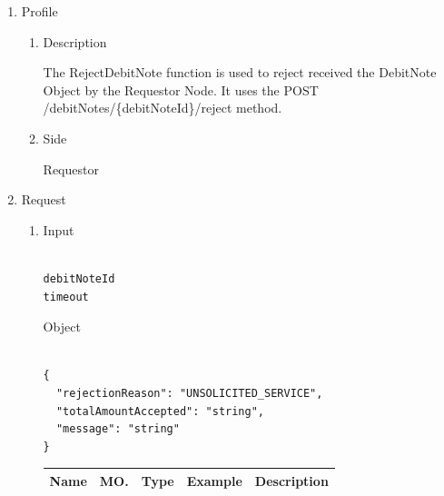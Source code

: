 \newpage



\begin{enumerate}

\item Profile

\begin{enumerate}

\item Description

The RejectDebitNote function is used to reject received the DebitNote Object by the Requestor Node. 
It uses the POST /debitNotes/\{debitNoteId\}/reject method.

\item Side

Requestor

\end{enumerate}

\item Request

\begin{enumerate}

\item Input

\begin{tcolorbox}[boxrule=0pt, frame empty]
\begin{verbatim}

debitNoteId
timeout

\end{verbatim}
\end{tcolorbox}

Object

\begin{tcolorbox}[boxrule=0pt, frame empty]
\begin{verbatim}

{
  "rejectionReason": "UNSOLICITED_SERVICE",
  "totalAmountAccepted": "string",
  "message": "string"
}

\end{verbatim}
\end{tcolorbox}

\begin{table}[H]
\footnotesize

\begin{center}
\begin{tabular}{|p{3cm}|l|p{3cm}|p{3cm}|p{4cm}|} 
\hline
\rowcolor{lightgray}	Name	& MO.	& Type	& Example & 	Description \\
\hline


\end{tabular}
\end{center}
\end{table}
\end{enumerate}
\end{enumerate}
